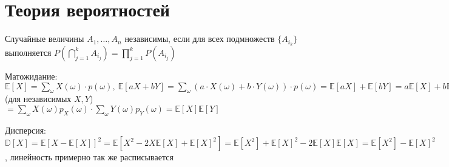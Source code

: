 \section{Теория вероятностей}

Случайные величины $A_1, \dots, A_n$ независимы, если для всех подмножеств $\{A_{i_k}\}$ выполняется $P(\bigcap \limits_{j=1}^{k} A_{i_j}) = \prod \limits_{j=1}^{k} P(A_{i_j})$

Матожидание: $\mathbb{E}[X] = \sum \limits_{\omega} X(\omega) \cdot p(\omega), \ \mathbb{E}[aX + bY] = \sum \limits_{\omega} (a \cdot X(\omega) + b \cdot Y(\omega)) \cdot p(\omega) = \mathbb{E}[aX] + \mathbb{E}[bY] = a \mathbb{E}[X] + b \mathbb{E}[Y], \ \mathbb{E}[XY] = \sum \limits_{\omega} X(\omega) Y(\omega) p_X(\omega) p_Y(\omega)$ (для независимых $X, Y$) $= \sum \limits_{\omega} X(\omega) p_X(\omega) \cdot \sum \limits_{\omega} Y(\omega) p_Y(\omega) = \mathbb{E}[X] \mathbb{E}[Y]$

Дисперсия: $\mathbb{D}[X] = \mathbb{E}[X - \mathbb{E}[X]]^2 = \mathbb{E}[X^2 - 2X\mathbb{E}[X] + \mathbb{E}[X]^2] = \mathbb{E}[X^2] + \mathbb{E}[X]^2 - 2\mathbb{E}[X]\mathbb{E}[X] = \mathbb{E}[X^2] - \mathbb{E}[X]^2$, линейность примерно так же расписывается

